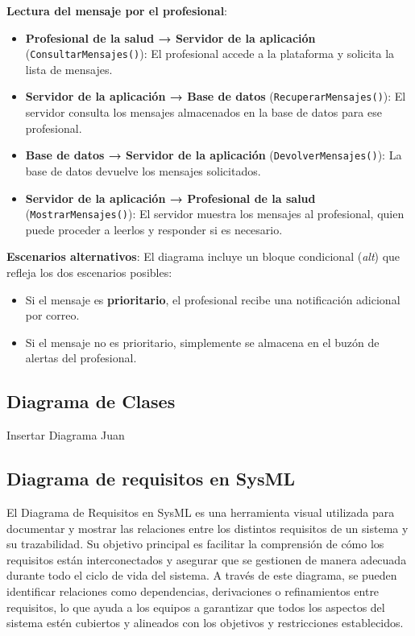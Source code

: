 \documentclass{article}
\begin{document}
\textbf{Lectura del mensaje por el profesional}:
\begin{itemize}
	\item \textbf{Profesional de la salud → Servidor de la aplicación} (\texttt{ConsultarMensajes()}): El profesional accede a la plataforma y solicita la lista de mensajes.
	\item \textbf{Servidor de la aplicación → Base de datos} (\texttt{RecuperarMensajes()}): El servidor consulta los mensajes almacenados en la base de datos para ese profesional.
	\item \textbf{Base de datos → Servidor de la aplicación} (\texttt{DevolverMensajes()}): La base de datos devuelve los mensajes solicitados.
	\item \textbf{Servidor de la aplicación → Profesional de la salud} (\texttt{MostrarMensajes()}): El servidor muestra los mensajes al profesional, quien puede proceder a leerlos y responder si es necesario.
\end{itemize}

\textbf{Escenarios alternativos}:
El diagrama incluye un bloque condicional (\textit{alt}) que refleja los dos escenarios posibles:
\begin{itemize}
	\item Si el mensaje es \textbf{prioritario}, el profesional recibe una notificación adicional por correo.
	\item Si el mensaje no es prioritario, simplemente se almacena en el buzón de alertas del profesional.
\end{itemize}




\subsection{Diagrama de Clases}

Insertar Diagrama Juan

\subsection{Diagrama de requisitos en  SysML}

El Diagrama de Requisitos en SysML es una herramienta visual utilizada para documentar y mostrar las relaciones entre los distintos requisitos de un sistema y su trazabilidad. Su objetivo principal es facilitar la comprensión de cómo los requisitos están interconectados y asegurar que se gestionen de manera adecuada durante todo el ciclo de vida del sistema. A través de este diagrama, se pueden identificar relaciones como dependencias, derivaciones o refinamientos entre requisitos, lo que ayuda a los equipos a garantizar que todos los aspectos del sistema estén cubiertos y alineados con los objetivos y restricciones establecidos.
\\
\end{document}
